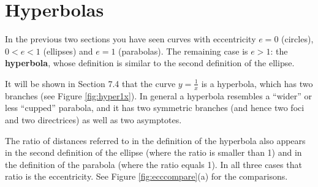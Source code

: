 \section{Hyperbolas}
In the previous two sections you have seen curves with eccentricity $e=0$
(circles), $0<e<1$ (ellipses) and $e=1$ (parabolas). The remaining case
is $e>1$: the \textbf{hyperbola}, whose definition is similar to the second
definition of the ellipse.


\piccaption[]{\label{fig:hyper1x}}
It will be shown in Section 7.4 that the curve $y=\frac{1}{x}$ is a hyperbola,
which has two branches (see Figure \ref{fig:hyper1x}). In general a
hyperbola resembles a ``wider'' or less ``cupped'' parabola, and it has two
symmetric branches (and hence two foci and two directrices) as well as two
asymptotes.

The ratio of distances referred to in the definition of the hyperbola also
appears in the second definition of the ellipse (where the ratio is smaller than
1) and in the definition of the parabola (where the ratio equals 1). In all
three cases that ratio is the eccentricity. See Figure \ref{fig:ecccompare}(a)
for the comparisons.

